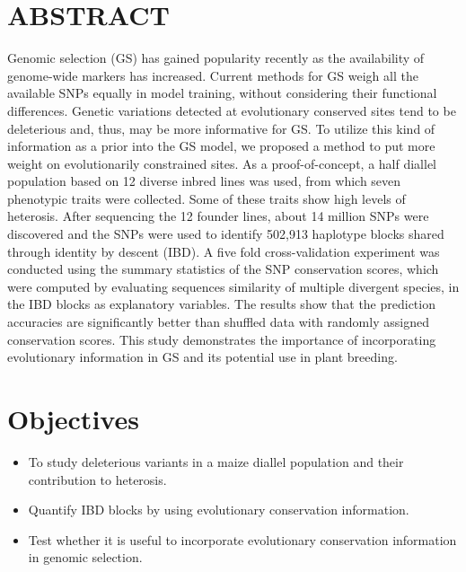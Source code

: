 \documentclass[a0,portrait]{a0poster}
\begin{document}
\begin{multicols}{2} %


\color{Navy} %

\section*{ABSTRACT}
Genomic selection (GS) has gained popularity recently as the availability of genome-wide markers has increased. Current methods for GS weigh all the available SNPs equally in model training, without considering their functional differences. Genetic variations detected at evolutionary conserved sites tend to be deleterious and, thus, may be more informative for GS. To utilize this kind of information as a prior into the GS model, we proposed a method to put more weight on evolutionarily constrained sites. As a proof-of-concept, a half diallel population based on 12 diverse inbred lines was used, from which seven phenotypic traits were collected. Some of these traits show high levels of heterosis. After sequencing the 12 founder lines, about 14 million SNPs were discovered and the SNPs were used to identify 502,913 haplotype blocks shared through identity by descent (IBD). A five fold cross-validation experiment was conducted using the summary statistics of the SNP conservation scores, which were computed by evaluating sequences similarity of multiple divergent species, in the IBD blocks as explanatory variables. The results show that the prediction accuracies are significantly better than shuffled data with randomly assigned conservation scores. This study demonstrates the importance of incorporating evolutionary information in GS and its potential use in plant breeding.



\color{SaddleBrown} %

\section*{Objectives}
\begin{itemize}
\item To study deleterious variants in a maize diallel population and their contribution to heterosis.
\item Quantify IBD blocks by using evolutionary conservation information.
\item Test whether it is useful to incorporate evolutionary conservation information in genomic selection.
\end{itemize}


\end{multicols}
\end{document}
